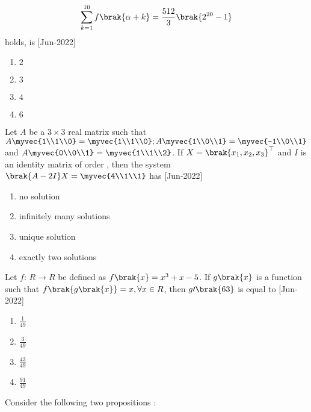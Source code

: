     $$\sum_{k=1}^{10}f\brak{\alpha+k}=\frac{512}{3}\brak{2^{20}-1}$$
    holds, is
    \hfill{[Jun-2022]}
        \begin{enumerate}
            \item $2$
            \item $3$
            \item $4$
            \item $6$
        \end{enumerate}
    \item Let $A$ be a $3\times 3$ real matrix such that $A\myvec{1\\1\\0}=\myvec{1\\1\\0};A\myvec{1\\0\\1}=\myvec{-1\\0\\1}$ and $A\myvec{0\\0\\1}=\myvec{1\\1\\2}$.
    If $X=\brak{x_1,x_2,x_3}^\top$ and $I$ is an identity matrix of order , then the system $\brak{A-2I}X=\myvec{4\\1\\1}$ has
    \hfill{[Jun-2022]}
        \begin{enumerate}
            \item no solution
            \item infinitely many solutions
            \item unique solution
            \item exactly two solutions
        \end{enumerate}
    \item Let $f\colon\, R\to R$ be defined as $f\brak{x}=x^3+x-5$. If $g\brak{x}$ is a function such that $f\brak{g\brak{x}}=x,\forall x\in R$, then $g\prime\brak{63}$ is equal to
    \hfill{[Jun-2022]}
        \begin{enumerate}
            \item $\frac{1}{49}$
            \item $\frac{3}{49}$
            \item $\frac{43}{49}$
            \item $\frac{91}{49}$
        \end{enumerate}
    \item Consider the following two propositions $\colon$\\
